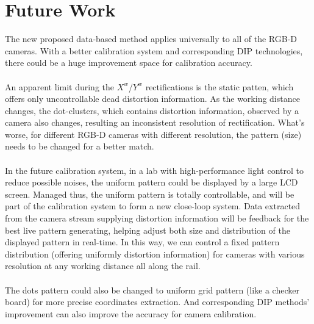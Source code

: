 \section{Future Work}
%
The new proposed data-based method applies universally to all of the RGB-D cameras. With a better calibration system and corresponding DIP technologies, there could be a huge improvement space for calibration accuracy.
\\\\%
An apparent limit during the \(X^w\)/\(Y^w\) rectifications is the static patten, which offers only uncontrollable dead distortion information. As the working distance changes, the dot-clusters, which contains distortion information, observed by a camera also changes, resulting an inconsistent resolution of rectification. What's worse, for different RGB-D cameras with different resolution, the pattern (size) needs to be changed for a better match. 
\\\\%
In the future calibration system, in a lab with high-performance light control to reduce possible noises, the uniform pattern could be displayed by a large LCD screen. Managed thus, the uniform pattern is totally controllable, and will be part of the calibration system to form a new close-loop system. Data extracted from the camera stream supplying distortion information will be feedback for the best live pattern generating, helping adjust both size and distribution of the displayed pattern in real-time. In this way, we can control a fixed pattern distribution (offering uniformly distortion information) for cameras with various resolution at any working distance all along the rail.
\\\\%
The dots pattern could also be changed to uniform grid pattern (like a checker board) for more precise coordinates extraction. And corresponding DIP methods' improvement can also improve the accuracy for camera calibration.






































